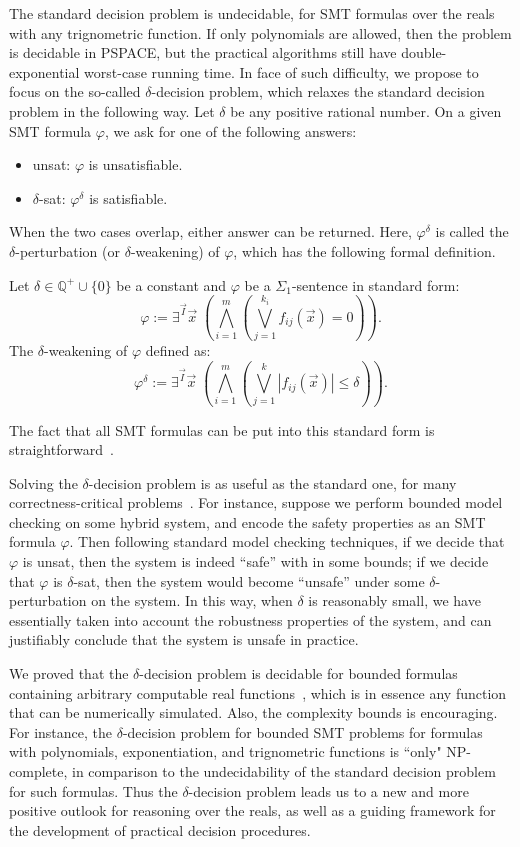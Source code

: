 \documentclass[envcountsect]{llncs}
\begin{document}
The standard decision problem is undecidable, for SMT formulas
over the reals with any trignometric function. If only polynomials are allowed,
then the problem is decidable in {\sf PSPACE}, but the practical algorithms
still have
double-exponential worst-case running time. In face of such difficulty, we
propose to focus on the so-called $\delta$-decision problem, which relaxes the
standard decision problem in the following way. Let $\delta$ be any positive
rational number. On a given SMT formula $\varphi$, we ask for one of the
following answers:
\begin{itemize}
 \item {\sf unsat}: $\varphi$ is unsatisfiable.
 \item {\sf $\delta$-sat}: $\varphi^{\delta}$ is satisfiable.
\end{itemize}
When the two cases overlap, either answer can be returned. Here,
$\varphi^{\delta}$ is called the $\delta$-perturbation (or $\delta$-weakening)
of $\varphi$, which has the following formal definition. 
\begin{definition}
 Let $\delta\in \mathbb{Q}^+\cup\{0\}$ be a constant and $\varphi$ be a
$\Sigma_1$-sentence in standard form:
\[\varphi:= \exists^{\vec I}\vec x\;(\bigwedge_{i=1}^m (\bigvee_{j=1}^{k_i}
f_{ij}(\vec x)= 0)).
\]
The $\delta$-weakening of $\varphi$ defined as:
\[\varphi^{\delta}:= \exists^{\vec I} \vec x\;(\bigwedge_{i=1}^m(\bigvee_{j=1}^k
|f_{ij}(\vec x)|\leq \delta)).\]
\end{definition}
The fact that all SMT formulas can be put into this standard form is
straightforward~\cite{}. 

Solving the $\delta$-decision problem is as useful as the standard one, for many
correctness-critical problems~\cite{}. For instance, suppose we perform bounded
model checking on some hybrid system, and encode the safety properties as an SMT
formula $\varphi$. Then following standard model checking techniques, if we
decide that $\varphi$ is {\sf unsat}, then the system is indeed ``safe'' with in
some bounds; if we decide that $\varphi$ is {\sf $\delta$-sat}, then the system
would become ``unsafe'' under some $\delta$-perturbation on the system. In this
way, when $\delta$ is reasonably small, we have essentially taken into account 
the robustness properties of the system, and can justifiably conclude that the
system is unsafe in practice. 

We
proved that the $\delta$-decision problem is decidable for bounded formulas
containing arbitrary computable real functions~\cite{}, which is in essence any
function that can be numerically simulated. Also, the complexity bounds is
encouraging. For instance, the $\delta$-decision problem for bounded SMT
problems for formulas with polynomials,
exponentiation, and trignometric functions is ``only" {\sf NP}-complete, in
comparison to the undecidability of the standard decision problem for such
formulas.  Thus the $\delta$-decision problem leads us to a new and more
positive outlook for reasoning over the reals, as well
as a guiding framework for the development of practical decision procedures. 
\end{document}
